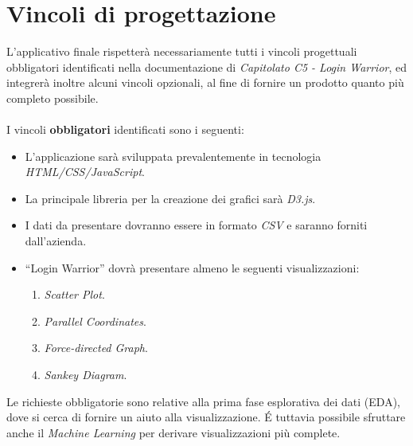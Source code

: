 \section{Vincoli di progettazione}

L'applicativo finale rispetterà necessariamente tutti i vincoli progettuali obbligatori identificati nella documentazione di \textit{Capitolato C5 - Login Warrior}, ed integrerà inoltre alcuni vincoli opzionali, al fine di fornire un prodotto quanto più completo possibile. \\ \\
I vincoli \textbf{obbligatori} identificati sono i seguenti:
\begin{itemize}
	\item L’applicazione sarà sviluppata prevalentemente in tecnologia 				\textit{HTML/CSS/JavaScript}.
	\item La principale libreria per la creazione dei grafici sarà \textit{D3.js}.
	\item I dati da presentare dovranno essere in formato \textit{CSV} e saranno forniti 
			dall'azienda.
	\item “Login Warrior” dovrà presentare almeno le seguenti visualizzazioni:
		 \begin{enumerate}
                    \item \textit{Scatter Plot}.
                    \item \textit{Parallel Coordinates}.
                    \item \textit{Force-directed Graph}.
                    \item \textit{Sankey Diagram}. \\
		\end{enumerate}
\end{itemize}

\noindent
Le richieste obbligatorie sono relative alla prima fase esplorativa dei dati (EDA), dove si cerca di fornire un aiuto alla visualizzazione. \' E tuttavia possibile sfruttare anche il \textit{Machine Learning} per derivare visualizzazioni più complete.

